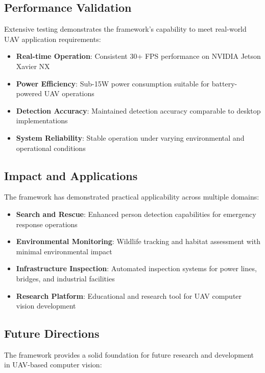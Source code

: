 \documentclass[12pt,a4paper]{article}
\begin{document}
\subsection{Performance Validation}

Extensive testing demonstrates the framework's capability to meet real-world UAV application requirements:

\begin{itemize}
    \item \textbf{Real-time Operation}: Consistent 30+ FPS performance on NVIDIA Jetson Xavier NX
    \item \textbf{Power Efficiency}: Sub-15W power consumption suitable for battery-powered UAV operations
    \item \textbf{Detection Accuracy}: Maintained detection accuracy comparable to desktop implementations
    \item \textbf{System Reliability}: Stable operation under varying environmental and operational conditions
\end{itemize}

\subsection{Impact and Applications}

The framework has demonstrated practical applicability across multiple domains:

\begin{itemize}
    \item \textbf{Search and Rescue}: Enhanced person detection capabilities for emergency response operations
    \item \textbf{Environmental Monitoring}: Wildlife tracking and habitat assessment with minimal environmental impact
    \item \textbf{Infrastructure Inspection}: Automated inspection systems for power lines, bridges, and industrial facilities
    \item \textbf{Research Platform}: Educational and research tool for UAV computer vision development
\end{itemize}

\subsection{Future Directions}

The framework provides a solid foundation for future research and development in UAV-based computer vision:
\end{document}
